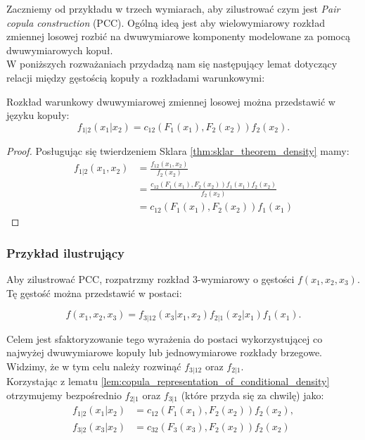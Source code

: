 Zaczniemy od przykładu w trzech wymiarach, aby zilustrować czym jest \emph{Pair copula construction} (PCC). Ogólną ideą jest aby wielowymiarowy rozkład zmiennej losowej rozbić na dwuwymiarowe komponenty modelowane za pomocą dwuwymiarowych kopuł.\\

W poniższych rozważaniach przydadzą nam się następujący lemat dotyczący relacji między gęstością kopuły a rozkładami warunkowymi:

\begin{lemma}
	Rozkład warunkowy dwuwymiarowej zmiennej losowej można przedstawić w języku kopuły:	
	$$ f_{1|2}(x_1|x_2) =c_{12}(F_1(x_1), F_2(x_2))f_2(x_2).$$
	\label{lem:copula_representation_of_conditional_density}
\end{lemma}
\begin{proof}
	Posługując się twierdzeniem Sklara \ref{thm:sklar_theorem_density} mamy:
	\begin{equation*}
		\begin{split}
			f_{1|2}(x_1, x_2) & = \frac{f_{12}(x_1, x_2)}{f_2(x_2)} \\
			& = \frac{c_{12}(F_1(x_1), F_2(x_2))f_1(x_1)f_2(x_2)}{f_2(x_2)}\\
			& = c_{12}(F_1(x_1), F_2(x_2))f_1(x_1)
		\end{split}
	\end{equation*}
\end{proof}

\subsubsection{Przykład ilustrujący}
\label{subsub:przyklad_3_wymiary}
Aby zilustrować PCC, rozpatrzmy rozkład $3$-wymiarowy o gęstości $f(x_1, x_2, x_3)$. Tę gęstość można przedstawić w postaci:

$$ f(x_1, x_2, x_3) = f_{3|12}(x_3|x_1, x_2)f_{2|1}(x_2|x_1)f_1(x_1).$$

Celem jest sfaktoryzowanie tego wyrażenia do postaci wykorzystującej co najwyżej dwuwymiarowe kopuły lub jednowymiarowe rozkłady brzegowe. Widzimy, że w tym celu należy rozwinąć $f_{3|12}$ oraz $f_{2|1}$. \\
Korzystając z lematu \ref{lem:copula_representation_of_conditional_density} otrzymujemy bezpośrednio $f_{2|1}$ oraz $f_{3|1}$ (które przyda się za chwilę) jako:
\begin{equation*}
	\begin{split}
		f_{1|2}(x_1|x_2) &= c_{12}(F_1(x_1), F_2(x_2))f_2(x_2),\\
		f_{3|2}(x_3|x_2) &= c_{32}(F_3(x_3), F_2(x_2))f_2(x_2)
	\end{split}
\end{equation*}

